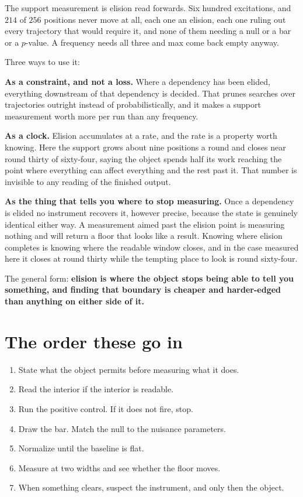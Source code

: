 The support measurement is elision read forwards. Six hundred excitations, and \(214\) of \(256\) positions never move at all, each one an elision, each one ruling out every trajectory that would require it, and none of them needing a null or a bar or a \(p\)-value. A frequency needs all three and max come back empty anyway.

Three ways to use it:

\textbf{As a constraint, and not a loss.} Where a dependency has been elided, everything downstream of that dependency is decided. That prunes searches over trajectories outright instead of probabilistically, and it makes a support measurement worth more per run than any frequency.

\textbf{As a clock.} Elision accumulates at a rate, and the rate is a property worth knowing. Here the support grows about nine positions a round and closes near round thirty of sixty-four, saying the object spends half its work reaching the point where everything can affect everything and the rest past it. That number is invisible to any reading of the finished output.

\textbf{As the thing that tells you where to stop measuring.} Once a dependency is elided no instrument recovers it, however precise, because the state is genuinely identical either way. A measurement aimed past the elision point is measuring nothing and will return a floor that looks like a result. Knowing where elision completes is knowing where the readable window closes, and in the case measured here it closes at round thirty while the tempting place to look is round sixty-four.

The general form: \textbf{elision is where the object stops being able to tell you something, and finding that boundary is cheaper and harder-edged than anything on either side of it.}

\section{The order these go in}

\begin{enumerate}
  \item State what the object permits before measuring what it does.
  \item Read the interior if the interior is readable.
  \item Run the positive control. If it does not fire, stop.
  \item Draw the bar. Match the null to the nuisance parameters.
  \item Normalize until the baseline is flat.
  \item Measure at two widths and see whether the floor moves.
  \item When something clears, suspect the instrument, and only then the object.
\end{enumerate}
